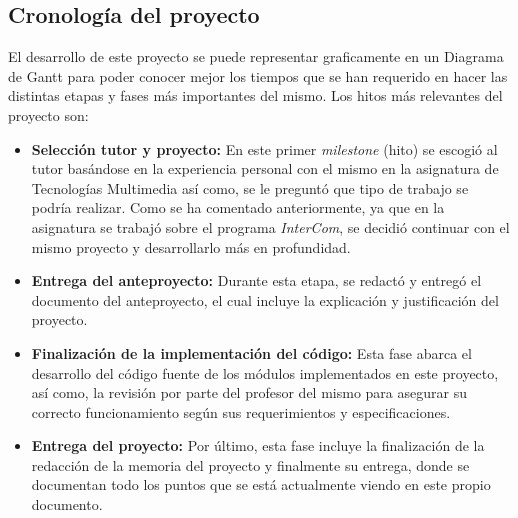 \subsection{Cronología del proyecto}
El desarrollo de este proyecto se puede representar graficamente en un Diagrama de Gantt para poder conocer mejor los tiempos que se han requerido en hacer las distintas etapas y fases más importantes del mismo. Los hitos más relevantes del proyecto son:
\begin{itemize}
    \item \textbf{Selección tutor y proyecto:} En este primer \textit{milestone} (hito) se escogió al tutor basándose en la experiencia personal con el mismo en la asignatura de Tecnologías Multimedia así como, se le preguntó que tipo de trabajo se podría realizar. Como se ha comentado anteriormente, ya que en la asignatura se trabajó sobre el programa \textit{InterCom}, se decidió continuar con el mismo proyecto y desarrollarlo más en profundidad.
    \item \textbf{Entrega del anteproyecto:} Durante esta etapa, se redactó y entregó el documento del anteproyecto, el cual incluye la explicación y justificación del proyecto. 
    \item \textbf{Finalización de la implementación del código:} Esta fase abarca el desarrollo del código fuente de los módulos implementados en este proyecto, así como, la revisión por parte del profesor del mismo para asegurar su correcto funcionamiento según sus requerimientos y especificaciones.
    \item \textbf{Entrega del proyecto:} Por último, esta fase incluye la finalización de la redacción de la memoria del proyecto y finalmente su entrega, donde se documentan todo los puntos que se está actualmente viendo en este propio documento.
\end{itemize}

\vspace{\baselineskip}
\vspace{\baselineskip}
\vspace{\baselineskip}
\vspace{\baselineskip}


